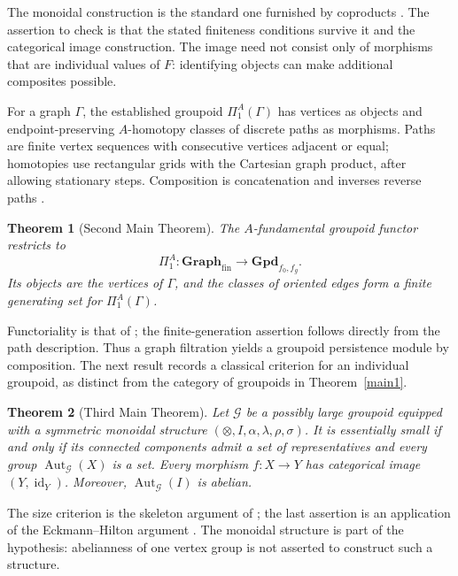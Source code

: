 \documentclass{amsart}
\newtheorem{theorem}{Theorem}[section]
\begin{document}
The monoidal construction is the standard one furnished by coproducts \cite[Section~VII.1, p.~163; Section~XI.1]{maclane1998categories}. The assertion to check is that the stated finiteness conditions survive it and the categorical image construction. The image need not consist only of morphisms that are individual values of $F$: identifying objects can make additional composites possible.

For a graph $\Gamma$, the established groupoid $\Pi_1^A(\Gamma)$ has vertices as objects and endpoint-preserving $A$-homotopy classes of discrete paths as morphisms. Paths are finite vertex sequences with consecutive vertices adjacent or equal; homotopies use rectangular grids with the Cartesian graph product, after allowing stationary steps. Composition is concatenation and inverses reverse paths \cite[Sections~1.3--1.5, 2; Definition~3.4]{kapulkin_grupoid}.

\begin{theorem}[Second Main Theorem]\label{main2}
The $A$-fundamental groupoid functor restricts to
\[
\Pi_1^A:\mathbf{Graph}_{\mathrm{fin}}\longrightarrow
\mathbf{Gpd}_{f_0,f_g}.
\]
Its objects are the vertices of $\Gamma$, and the classes of oriented edges form a finite generating set for $\Pi_1^A(\Gamma)$.
\end{theorem}

Functoriality is that of \cite[Definition~3.4 and the following paragraph]{kapulkin_grupoid}; the finite-generation assertion follows directly from the path description. Thus a graph filtration yields a groupoid persistence module by composition. The next result records a classical criterion for an individual groupoid, as distinct from the category of groupoids in Theorem~\ref{main1}.

\begin{theorem}[Third Main Theorem]\label{main3}
Let $\mathcal G$ be a possibly large groupoid equipped with a symmetric monoidal structure $(\otimes,I,\alpha,\lambda,\rho,\sigma)$. It is essentially small if and only if its connected components admit a set of representatives and every group $\operatorname{Aut}_{\mathcal G}(X)$ is a set. Every morphism $f:X\to Y$ has categorical image $(Y,\operatorname{id}_Y)$. Moreover, $\operatorname{Aut}_{\mathcal G}(I)$ is abelian.
\end{theorem}

The size criterion is the skeleton argument of \cite[Section~IV.4, pp.~93--94]{maclane1998categories}; the last assertion is an application of the Eckmann--Hilton argument \cite[Theorem~1.3.1, pp.~10--11]{ronbrown2}. The monoidal structure is part of the hypothesis: abelianness of one vertex group is not asserted to construct such a structure.
\end{document}
